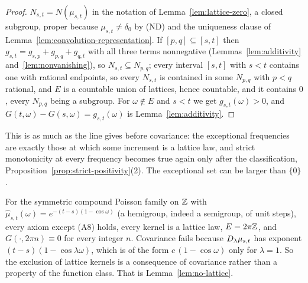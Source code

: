\begin{proof}
$N_{s,t} = N(\mu_{s,t})$ in the notation of Lemma~\ref{lem:lattice-zero}, a closed subgroup,
proper because $\mu_{s,t} \ne \delta_0$ by (ND) and the uniqueness clause of
Lemma~\ref{lem:convolution-representation}. If $[p,q] \subseteq [s,t]$ then
$g_{s,t} = g_{s,p} + g_{p,q} + g_{q,t}$ with all three terms nonnegative
(Lemmas~\ref{lem:additivity} and~\ref{lem:nonvanishing}), so $N_{s,t} \subseteq N_{p,q}$;
every interval $[s,t]$ with $s < t$ contains one with rational endpoints, so every $N_{s,t}$
is contained in some $N_{p,q}$ with $p < q$ rational, and $E$ is a countable union of
lattices, hence countable, and it contains $0$, every $N_{p,q}$ being a subgroup. For
$\omega \notin E$ and $s < t$ we get $g_{s,t}(\omega) > 0$, and
$G(t,\omega) - G(s,\omega) = g_{s,t}(\omega)$ is Lemma~\ref{lem:additivity}.
\end{proof}

This is as much as the line gives before covariance: the exceptional frequencies are exactly
those at which some increment is a lattice law, and strict monotonicity at every frequency
becomes true again only after the classification, Proposition~\ref{prop:strict-positivity}(2).
The exceptional set can be larger than $\{0\}$.

\begin{remark}\label{rem:lattice-family}
For the symmetric compound Poisson family on $\mathbb{Z}$ with
$\hat\mu_{s,t}(\omega) = e^{-(t-s)(1-\cos\omega)}$ (a hemigroup, indeed a semigroup, of unit
steps), every axiom except (A8) holds, every kernel is a lattice law,
$E = 2\pi\mathbb{Z}$, and $G(\cdot,2\pi n) \equiv 0$ for every integer $n$. Covariance
fails because $D_{\lambda}\mu_{s,t}$ has exponent $(t-s)(1-\cos\lambda\omega)$, which is of
the form $c\,(1-\cos\omega)$ only for $\lambda = 1$. So the exclusion of lattice kernels is a
consequence of covariance rather than a property of the function class. That is
Lemma~\ref{lem:no-lattice}.
\end{remark}

